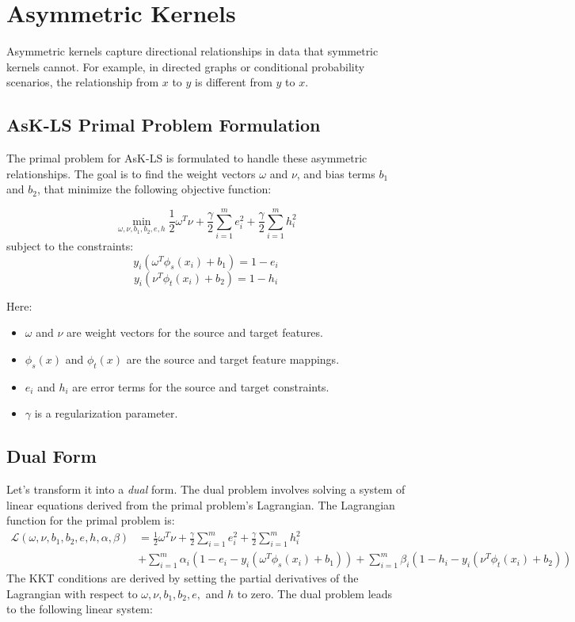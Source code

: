 \section{Asymmetric Kernels}
\label{sec:asymmetric_kernels}

Asymmetric kernels capture directional relationships in data that symmetric kernels cannot. For example, in directed graphs or conditional probability scenarios, the relationship from \(x\) to \(y\) is different from \(y\) to \(x\).

\subsection{AsK-LS Primal Problem Formulation}
The primal problem for AsK-LS is formulated to handle these asymmetric relationships. The goal is to find the weight vectors \( \omega \) and \( \nu \), and bias terms \( b_1 \) and \( b_2 \), that minimize the following objective function:

\[
\min_{\omega, \nu, b_1, b_2, e, h} \frac{1}{2} \omega^T \nu + \frac{\gamma}{2} \sum_{i=1}^m e_i^2 + \frac{\gamma}{2} \sum_{i=1}^m h_i^2
\]
subject to the constraints:
\[
y_i (\omega^T \phi_s(x_i) + b_1) = 1 - e_i
\]
\[
y_i (\nu^T \phi_t(x_i) + b_2) = 1 - h_i
\]

Here:
\begin{itemize}
	\item \( \omega \) and \( \nu \) are weight vectors for the source and target features.
	\item \( \phi_s(x) \) and \( \phi_t(x) \) are the source and target feature mappings.
	\item \( e_i \) and \( h_i \) are error terms for the source and target constraints.
	\item \( \gamma \) is a regularization parameter.
\end{itemize}

\subsection{Dual Form}
Let's transform it into a \textit{dual} form. The dual problem involves solving a system of linear equations derived from the primal problem's Lagrangian. The Lagrangian function for the primal problem is:
\begin{align*}
	\mathcal{L}( \omega, \nu, b_1, b_2, e, h, \alpha, \beta) &= \frac{1}{2} \omega^T \nu + \frac{\gamma}{2} \sum_{i=1}^m e_i^2 + \frac{\gamma}{2} \sum_{i=1}^m h_i^2\\ 
		   &+ \sum_{i=1}^m \alpha_i (1 - e_i - y_i (\omega^T \phi_s(x_i) + b_1)) + \sum_{i=1}^m \beta_i (1 - h_i - y_i (\nu^T \phi_t(x_i) + b_2))
\end{align*}
The KKT conditions are derived by setting the partial derivatives of the Lagrangian with respect to \( \omega, \nu, b_1, b_2, e, \) and \( h \) to zero. The dual problem leads to the following linear system:

